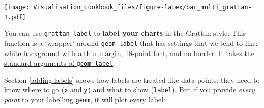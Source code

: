 \documentclass[]{book}
\newenvironment{Shaded}{\begin{snugshade}}{\end{snugshade}}
\newcommand{\CommentTok}[1]{\textcolor[rgb]{0.56,0.35,0.01}{\textit{#1}}}
\newcommand{\DataTypeTok}[1]{\textcolor[rgb]{0.13,0.29,0.53}{#1}}
\newcommand{\DecValTok}[1]{\textcolor[rgb]{0.00,0.00,0.81}{#1}}
\newcommand{\FloatTok}[1]{\textcolor[rgb]{0.00,0.00,0.81}{#1}}
\newcommand{\KeywordTok}[1]{\textcolor[rgb]{0.13,0.29,0.53}{\textbf{#1}}}
\newcommand{\NormalTok}[1]{#1}
\newcommand{\OperatorTok}[1]{\textcolor[rgb]{0.81,0.36,0.00}{\textbf{#1}}}
\newcommand{\OtherTok}[1]{\textcolor[rgb]{0.56,0.35,0.01}{#1}}
\newcommand{\StringTok}[1]{\textcolor[rgb]{0.31,0.60,0.02}{#1}}
\begin{document}
\texttt{[image: Visualisation\_cookbook\_files/figure-latex/bar\_multi\_grattan-1.pdf]}

You can use \texttt{grattan\_label} to \textbf{label your charts} in the Grattan style. This function is a `wrapper' around \texttt{geom\_label} that has settings that we tend to like: white background with a thin margin, 18-point font, and no border. It takes the \href{https://ggplot2.tidyverse.org/reference/geom_text.html}{standard arguments of \texttt{geom\_label}}.

Section \ref{adding-labels} shows how labels are treated like data points: they need to know where to go (\texttt{x} and \texttt{y}) and what to show (\texttt{label}). But if you provide \emph{every point} to your labelling \texttt{geom}, it will plot every label:

\begin{Shaded}
\end{Shaded}
\end{document}
